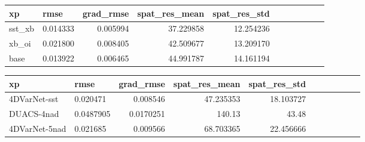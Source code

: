 \begin{tabular}{llrrrrrrrrr}
\toprule
            xp &       rmse &   grad\_rmse &   spat\_res\_mean &  spat\_res\_std\\
\midrule
   sst\_xb &      0.014333 &     0.005994 &        37.229858 &     12.254236 \\
    xb\_oi &      0.021800 &     0.008405 &        42.509677 &     13.209170 \\
     base &       0.013922 &     0.006465 &        44.991787 &     14.161194 \\
\bottomrule
\end{tabular}

\begin{tabular}{llrrrrrrrrr}
\toprule
            xp &         rmse &   grad\_rmse &   spat\_res\_mean &  spat\_res\_std \\
\midrule
   4DVarNet-sst &        0.020471 &          0.008546 &                 47.235353 &          18.103727 \\
    DUACS-4nad &        0.0487905 &         0.0170251 &                140.13 &          43.48 \\
     4DVarNet-5nad &         0.021685 &          0.009566 &                 68.703365 &          22.456666 \\
\bottomrule
\end{tabular}
